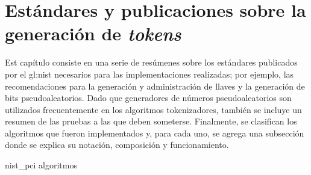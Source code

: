 %
%
%

\chapter{Estándares y publicaciones sobre la generación de \textit{tokens}}
\label{sec:generacion_de_tokens}

Est capítulo consiste en una serie de resúmenes sobre los estándares publicados
por el \gls{gl:nist} necesarios para las implementaciones realizadas; por
ejemplo, las recomendaciones para la generación y administración de llaves y la
generación de bits pseudoaleatorios. Dado que generadores de números
pseudoaleatorios son utilizados frecuentemente en los algoritmos tokenizadores,
también se incluye un resumen de las pruebas a las que deben someterse.
Finalmente, se clasifican los algoritmos que fueron implementados y, para cada
uno, se agrega una subsección donde se explica su notación, composición y
funcionamiento.

{nist_pci}
{algoritmos}
